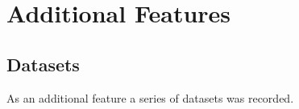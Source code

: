 \documentclass{article}
\begin{document}


\section{Additional Features}

\subsection{Datasets}

As an additional feature a series of datasets was recorded.
\end{document}
